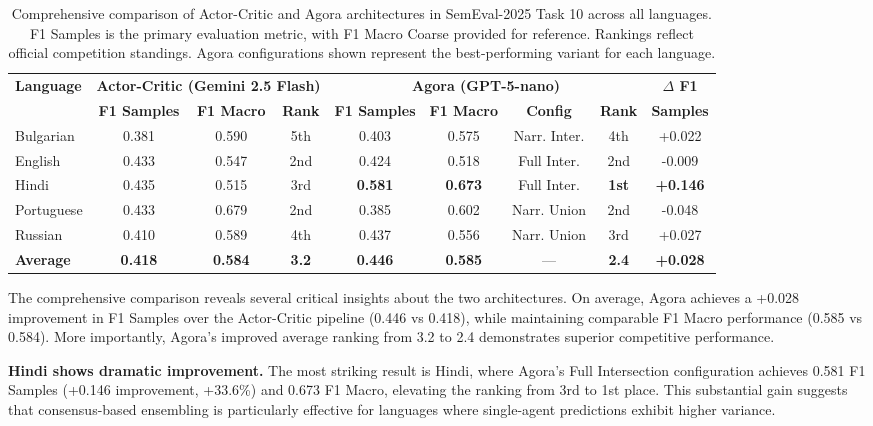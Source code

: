 \begin{table*}[ht]
\centering
\caption{Comprehensive comparison of Actor-Critic and Agora architectures in SemEval-2025 Task 10 across all languages. F1 Samples is the primary evaluation metric, with F1 Macro Coarse provided for reference. Rankings reflect official competition standings. Agora configurations shown represent the best-performing variant for each language.}
\label{tab:semeval_comprehensive}
\small
\begin{tabular}{lcccccccc}
\hline
\textbf{Language} & \multicolumn{3}{c}{\textbf{Actor-Critic (Gemini 2.5 Flash)}} & \multicolumn{4}{c}{\textbf{Agora (GPT-5-nano)}} & \textbf{$\Delta$ F1} \\
\cline{2-4} \cline{5-8}
& \textbf{F1 Samples} & \textbf{F1 Macro} & \textbf{Rank} & \textbf{F1 Samples} & \textbf{F1 Macro} & \textbf{Config} & \textbf{Rank} & \textbf{Samples} \\
\hline
Bulgarian & 0.381 & 0.590 & 5th & 0.403 & 0.575 & Narr. Inter. & 4th & +0.022 \\
English & 0.433 & 0.547 & 2nd & 0.424 & 0.518 & Full Inter. & 2nd & -0.009 \\
Hindi & 0.435 & 0.515 & 3rd & \textbf{0.581} & \textbf{0.673} & Full Inter. & \textbf{1st} & \textbf{+0.146} \\
Portuguese & 0.433 & 0.679 & 2nd & 0.385 & 0.602 & Narr. Union & 2nd & -0.048 \\
Russian & 0.410 & 0.589 & 4th & 0.437 & 0.556 & Narr. Union & 3rd & +0.027 \\
\hline
\textbf{Average} & \textbf{0.418} & \textbf{0.584} & \textbf{3.2} & \textbf{0.446} & \textbf{0.585} & --- & \textbf{2.4} & \textbf{+0.028} \\
\hline
\end{tabular}
\end{table*}

The comprehensive comparison reveals several critical insights about the two architectures. On average, Agora achieves a +0.028 improvement in F1 Samples over the Actor-Critic pipeline (0.446 vs 0.418), while maintaining comparable F1 Macro performance (0.585 vs 0.584). More importantly, Agora's improved average ranking from 3.2 to 2.4 demonstrates superior competitive performance.

\textbf{Hindi shows dramatic improvement.} The most striking result is Hindi, where Agora's Full Intersection configuration achieves 0.581 F1 Samples (+0.146 improvement, +33.6\%) and 0.673 F1 Macro, elevating the ranking from 3rd to 1st place. This substantial gain suggests that consensus-based ensembling is particularly effective for languages where single-agent predictions exhibit higher variance.

